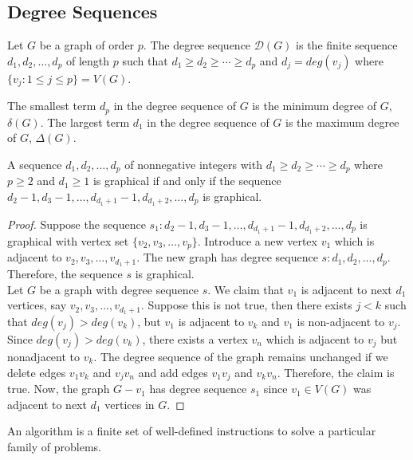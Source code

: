\subsection{Degree Sequences}
\begin{definition}
	Let $G$ be a graph of order $p$.
	The degree sequence $\mathcal{D}(G)$ is the finite sequence $d_1,d_2,\dots,d_p$ of length $p$ such that $d_1 \ge d_2 \ge \dotsb \ge d_p$ and $d_j = deg(v_j)$ where $\{ v_j : 1 \le j \le p \} = V(G)$.
\end{definition}

\begin{definition}
	The smallest term $d_p$ in the degree sequence of $G$ is the minimum degree of $G$, $\delta(G)$.
	The largest term $d_1$ in the degree sequence of $G$ is the maximum degree of $G$, $\Delta(G)$.
\end{definition}

\begin{theorem}
	A sequence $d_1,d_2,\dots,d_p$ of nonnegative integers with $d_1 \ge d_2 \ge \dotsb \ge d_p$ where $p \ge 2$ and $d_1 \ge 1$ is graphical if and only if the sequence $d_2-1,d_3-1,\dots,d_{d_1+1}-1,d_{d_1+2},\dots,d_p$ is graphical.
\end{theorem}
\begin{proof}
	Suppose the sequence $s_1 : d_2-1,d_3-1,\dots,d_{d_1+1}-1,d_{d_1+2},\dots,d_p$ is graphical with vertex set $\{v_2,v_3,\dots,v_p\}$.
	Introduce a new vertex $v_1$ which is adjacent to $v_2,v_3,\dots,v_{d_1+1}$.
	The new graph has degree sequence $s : d_1,d_2,\dots,d_p$.
	Therefore, the sequence $s$ is graphical.\\

	Let $G$ be a graph with degree sequence $s$.
	We claim that $v_1$ is adjacent to next $d_1$ vertices, say $v_2,v_3,\dots,v_{d_1+1}$.
	Suppose this is not true, then there exists $j<k$ such that $deg(v_j) > deg(v_k)$, but $v_1$ is adjacent to $v_k$ and $v_1$ is non-adjacent to $v_j$.
	Since $deg(v_j) > deg(v_k)$, there exists a vertex $v_n$ which is adjacent to $v_j$ but nonadjacent to $v_k$.
	The degree sequence of the graph remains unchanged if we delete edges $v_1v_k$ and $v_jv_n$ and add edges $v_1v_j$ and $v_kv_n$.
	Therefore, the claim is true.
	Now, the graph $G-v_1$ has degree sequence $s_1$ since $v_1 \in V(G)$ was adjacent to next $d_1$ vertices in $G$.
\end{proof}

\begin{definition}[algorithm]
	An algorithm is a finite set of well-defined instructions to solve a particular family of problems.
\end{definition}

